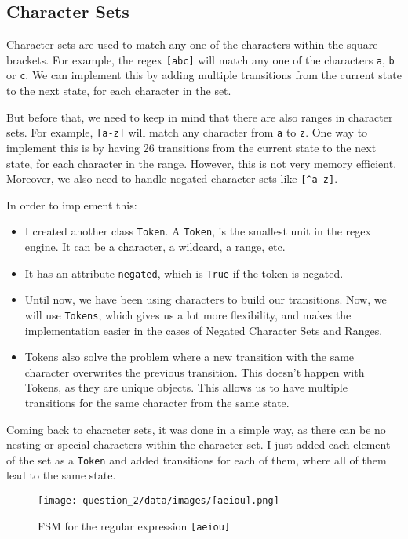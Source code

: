 \documentclass[12pt]{report}
\begin{document}
\subsection{Character Sets}

Character sets are used to match any one of the characters within the square brackets. For example, the regex \texttt{[abc]} will match any one of the characters \texttt{a}, \texttt{b} or \texttt{c}. We can implement this by adding multiple transitions from the current state to the next state, for each character in the set.

But before that, we need to keep in mind that there are also ranges in character sets. For example, \texttt{[a-z]} will match any character from \texttt{a} to \texttt{z}. One way to implement this is by having 26 transitions from the current state to the next state, for each character in the range. However, this is not very memory efficient. Moreover, we also need to handle negated character sets like \texttt{[\textasciicircum a-z]}.

In order to implement this:

\begin{itemize}
    \item I created another class \texttt{Token}. A \texttt{Token}, is the smallest unit in the regex engine. It can be a character, a wildcard, a range, etc.
    \item It has an attribute \texttt{negated}, which is \texttt{True} if the token is negated.
    \item Until now, we have been using characters to build our transitions. Now, we will use \texttt{Tokens}, which gives us a lot more flexibility, and makes the implementation easier in the cases of Negated Character Sets and Ranges. \item Tokens also solve the problem where a new transition with the same character overwrites the previous transition. This doesn't happen with Tokens, as they are unique objects. This allows us to have multiple transitions for the same character from the same state.
\end{itemize}

Coming back to character sets, it was done in a simple way, as there can be no nesting or special characters within the character set. I just added each element of the set as a \texttt{Token} and added transitions for each of them, where all of them lead to the same state.

\begin{figure}[H]
    \centering
    \texttt{[image: question\_2/data/images/[aeiou].png]}
    \caption{FSM for the regular expression \texttt{[aeiou]}}
\end{figure}
\end{document}
